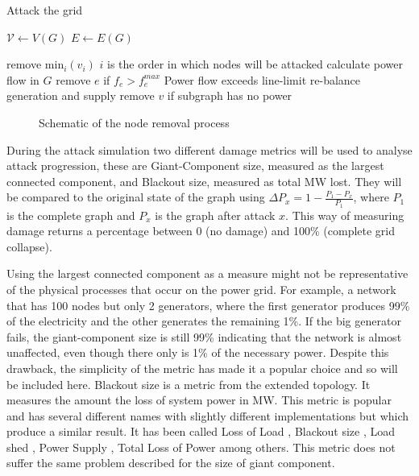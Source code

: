 \documentclass{article}
\begin{document}
\begin{algorithm}
\caption{Attack the grid}\label{algo:attackthegrid}
\begin{algorithmic}[1]

\State $\mathcal{V} \leftarrow  V(G)$
\State $E \leftarrow  E(G)$

\State remove $\text{min}_i(v_i)$ 
\Comment $i$ is the order in which nodes will be attacked
\Repeat
\State calculate power flow in $G$
\State  remove $e$ if $f_e > f_e^{max}$ \Comment Power flow exceeds line-limit
\EndFor
\State  re-balance generation and supply
\State  remove $v$ if subgraph has no power
\EndFor
{}
\EndWhile
\EndProcedure
\end{algorithmic}
\end{algorithm}

\begin{figure}
    \centering
    
    \caption{Schematic of the node removal process}
    \label{fig:AlgoSchem}
\end{figure}

During the attack simulation two different damage metrics will be used to analyse attack progression, these are Giant-Component size, measured as the largest connected component, and Blackout size, measured as total MW lost. They will be compared to the original state of the graph using $\Delta P_x= 1-\frac{P_1-P_x}{P_1}$, where $P_1$ is the complete graph and $P_x$ is the graph after attack $x$. This way of measuring damage returns a percentage between 0 (no damage) and 100\% (complete grid collapse).

Using the largest connected component as a measure might not be representative of the physical processes that occur on the power grid. For example, a network that has 100 nodes but only 2 generators, where the first generator produces 99\% of the electricity and the other generates the remaining 1\%. If the big generator fails, the giant-component size is still 99\% indicating that the network is almost unaffected, even though there only is 1\% of the necessary power. Despite this drawback, the simplicity of the metric has made it a popular choice \cite{AndreaPagani2014, Motter, Rosas-Casals2007,Pagani2011} and so will be included here.
Blackout size is a metric from the extended topology. It measures the amount the loss of system power in MW. This metric is popular and has several different names with slightly different implementations but which produce a similar result. It has been called Loss of Load \cite{Wang2011}, Blackout size \cite{Hines2010}, Load shed \cite{Carreras2016}, Power Supply \cite{Ouyang2014}, Total Loss of Power \cite{BrancucciMartinez-Anido2012} among others. This metric does not suffer the same problem described for the size of giant component.
\end{document}
